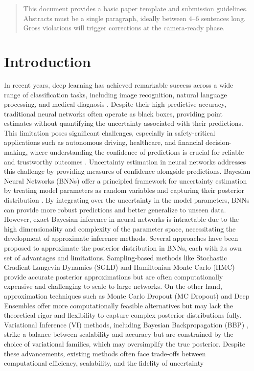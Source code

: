 \documentclass{article}
\begin{document}
\printAffiliationsAndNotice{\icmlEqualContribution} %

\begin{abstract}
This document provides a basic paper template and submission guidelines.
Abstracts must be a single paragraph, ideally between 4--6 sentences long.
Gross violations will trigger corrections at the camera-ready phase.
\end{abstract}

\section{Introduction}\label{sec:intro}

In recent years, deep learning has achieved remarkable success across a wide range of classification tasks, including image recognition, natural language processing, and medical diagnosis \cite{lecun2015deep}. Despite their high predictive accuracy, traditional neural networks often operate as black boxes, providing point estimates without quantifying the uncertainty associated with their predictions. This limitation poses significant challenges, especially in safety-critical applications such as autonomous driving, healthcare, and financial decision-making, where understanding the confidence of predictions is crucial for reliable and trustworthy outcomes \cite{kendall2017uncertainties}. Uncertainty estimation in neural networks addresses this challenge by providing measures of confidence alongside predictions. Bayesian Neural Networks (BNNs) offer a principled framework for uncertainty estimation by treating model parameters as random variables and capturing their posterior distribution \cite{blundell15}. By integrating over the uncertainty in the model parameters, BNNs can provide more robust predictions and better generalize to unseen data. However, exact Bayesian inference in neural networks is intractable due to the high dimensionality and complexity of the parameter space, necessitating the development of approximate inference methods. Several approaches have been proposed to approximate the posterior distribution in BNNs, each with its own set of advantages and limitations. Sampling-based methods like Stochastic Gradient Langevin Dynamics (SGLD) \cite{well11} and Hamiltonian Monte Carlo (HMC) \cite{neal12} provide accurate posterior approximations but are often computationally expensive and challenging to scale to large networks. On the other hand, approximation techniques such as Monte Carlo Dropout (MC Dropout) \cite{gal16} and Deep Ensembles \cite{lakshminarayanan17} offer more computationally feasible alternatives but may lack the theoretical rigor and flexibility to capture complex posterior distributions fully. Variational Inference (VI) methods, including Bayesian Backpropagation (BBP) \cite{blundell15}, strike a balance between scalability and accuracy but are constrained by the choice of variational families, which may oversimplify the true posterior. Despite these advancements, existing methods often face trade-offs between computational efficiency, scalability, and the fidelity of uncertainty 
\end{document}

